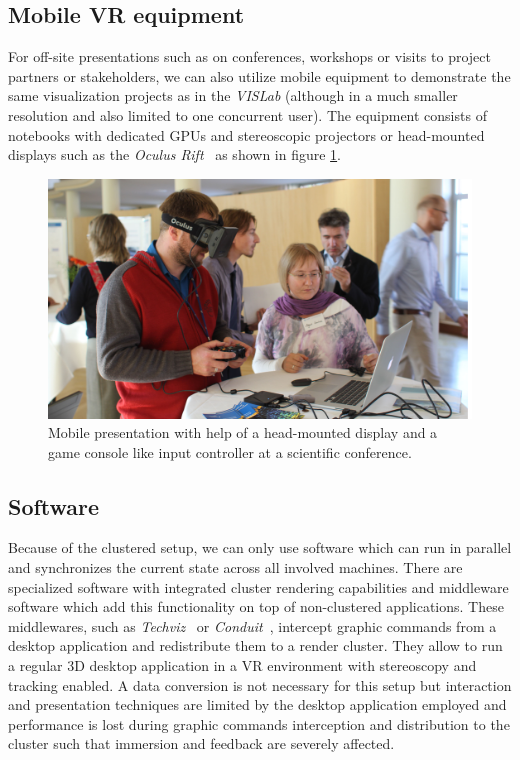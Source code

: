 \documentclass[twocolumn]{svjour3}          %
\begin{document}
\subsection{Mobile VR equipment}
\label{mobile-vr-equipment}

For off-site presentations such as on conferences, workshops or visits to project partners or stakeholders, we can also utilize mobile equipment to demonstrate the same visualization projects as in the \emph{VISLab} (although in a much smaller resolution and also limited to one concurrent user). The equipment consists of notebooks with dedicated GPUs and stereoscopic projectors or head-mounted displays such as the \emph{Oculus Rift}~\cite{web:rift} as shown in figure \ref{fig:rift}.

\begin{figure}[htb]
  \includegraphics[width=\linewidth]{images/rift.jpg}
\caption{Mobile presentation with help of a head-mounted display and a game console like input controller at a scientific conference.}
\label{fig:rift}
\end{figure}

\subsection{Software}
\label{software}

Because of the clustered setup, we can only use software which can run in parallel and synchronizes the current state across all involved machines. There are specialized software with integrated cluster rendering capabilities and middleware software which add this functionality on top of non-clustered applications. These middlewares, such as \emph{Techviz}~\cite{web:techviz} or \emph{Conduit}~\cite{web:conduit}, intercept graphic commands from a desktop application and redistribute them to a render cluster. They allow to run a regular 3D desktop application in a VR environment with stereoscopy and tracking enabled. A data conversion is not necessary for this setup but interaction and presentation techniques are limited by the desktop application employed and performance is lost during graphic commands interception and distribution to the cluster such that immersion and feedback are severely affected.
\end{document}

